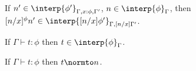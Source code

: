 \begin{lemma}
  If $n' \in \interp{\phi'}_{\Gamma,x:\phi,\Gamma'}$, $n \in \interp{\phi}_\Gamma$,
  then $[n/x]^\phi n' \in \interp{[n/x]\phi'}_{\Gamma,[n/x]\Gamma'}$.
  \label{lemma:interpretation_of_types_closed_substitution_ssfe}
\end{lemma}

\begin{thm}
  If $\Gamma \vdash t:\phi$ then $t \in \interp{\phi}_\Gamma$.
  \label{thm:soundness_ssfe}
\end{thm}

\begin{corollary}[Normalization]
  If $\Gamma \vdash t:\phi$ then $t \normto n$.
\end{corollary}
